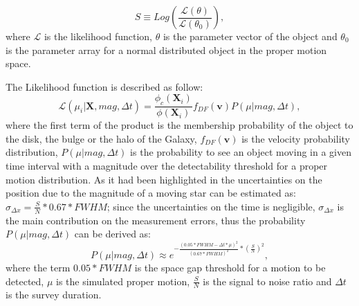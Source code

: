 \begin{equation}
    S\equiv Log\left(\frac{\mathcal{L}(\theta)}{\mathcal{L}(\theta_0)}\right),
\end{equation}
where $\mathcal{L}$ is the likelihood function, $\theta$ is the parameter vector of the object and $\theta_0$ is the parameter array for a normal distributed object in the proper motion space.

The Likelihood function is described as follow:
\begin{equation}
    \mathcal{L}\left(\mu_i|\mathbf{X}, mag, \Delta t\right)=\frac{\phi_c(\mathbf{X}_i)}{\phi(\mathbf{X}_i)} f_{DF}\left(\mathbf{v}\right)P\left(\mu|mag, \Delta t\right),
\end{equation}
where the first term of the product is the membership probability of the object to the disk, the bulge or the halo of the Galaxy, $f_{DF}\left(\mathbf{v}\right)$  is the velocity probability distribution, $P\left(\mu|mag, \Delta t\right)$ is the probability to see an object moving in a given time interval with a magnitude over the detectability threshold for a proper motion distribution.
As it had been highlighted in \citet{Kuijken02} the uncertainties on the position due to the magnitude of a moving star can be estimated as: $\sigma_{\Delta x}= \frac{S}{N}*0.67* FWHM$; since the uncertainties on the time is negligible,  $\sigma_{\Delta x}$ is the main contribution on the measurement errors, thus the probability $P\left(\mu|mag, \Delta t\right)$ can be derived as:
\begin{equation}
    P\left(\mu|mag, \Delta t\right) \approx e^{-\frac{(0.05*FWHM-\Delta t *\mu)^2 }{(0.67*FWHM)^2}*(\frac{S}{N})^2},
\end{equation}
where the term $0.05*FWHM$ is the space gap threshold for a motion to be detected, $\mu$ is the simulated proper motion, $\frac{S}{N}$ is the signal to noise ratio and $\Delta t$ is the survey duration.

